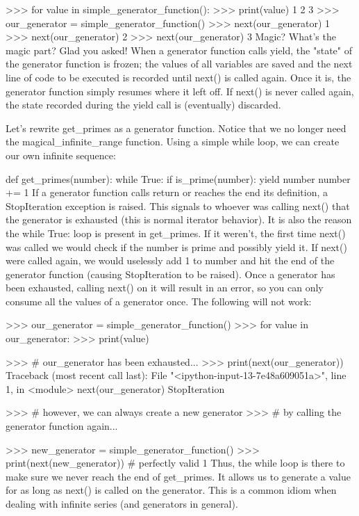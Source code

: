 >>> for value in simple_generator_function():
>>>     print(value)
1
2
3
>>> our_generator = simple_generator_function()
>>> next(our_generator)
1
>>> next(our_generator)
2
>>> next(our_generator)
3
Magic?
What's the magic part? Glad you asked! When a generator function calls yield, the "state" of the generator function is frozen; the values of all variables are saved and the next line of code to be executed is recorded until next() is called again. Once it is, the generator function simply resumes where it left off. If next() is never called again, the state recorded during the yield call is (eventually) discarded.

Let's rewrite get_primes as a generator function. Notice that we no longer need the magical_infinite_range function. Using a simple while loop, we can create our own infinite sequence:

def get_primes(number):
    while True:
        if is_prime(number):
            yield number
        number += 1
If a generator function calls return or reaches the end its definition, a StopIteration exception is raised. This signals to whoever was calling next() that the generator is exhausted (this is normal iterator behavior). It is also the reason the while True: loop is present in get_primes. If it weren't, the first time next() was called we would check if the number is prime and possibly yield it. If next() were called again, we would uselessly add 1 to number and hit the end of the generator function (causing StopIteration to be raised). Once a generator has been exhausted, calling next() on it will result in an error, so you can only consume all the values of a generator once. The following will not work:

>>> our_generator = simple_generator_function()
>>> for value in our_generator:
>>>     print(value)

>>> # our_generator has been exhausted...
>>> print(next(our_generator))
Traceback (most recent call last):
  File "<ipython-input-13-7e48a609051a>", line 1, in <module>
    next(our_generator)
StopIteration

>>> # however, we can always create a new generator
>>> # by calling the generator function again...

>>> new_generator = simple_generator_function()
>>> print(next(new_generator)) # perfectly valid
1
Thus, the while loop is there to make sure we never reach the end of get_primes. It allows us to generate a value for as long as next() is called on the generator. This is a common idiom when dealing with infinite series (and generators in general).


